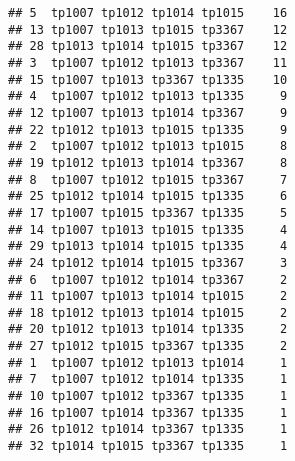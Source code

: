 \documentclass{article}\usepackage[]{graphicx}\usepackage[]{color}
\makeatletter
\newenvironment{kframe}{%
 \def\at@end@of@kframe{}%
 \ifinner\ifhmode%
  \def\at@end@of@kframe{\end{minipage}}%
  \begin{minipage}{\columnwidth}%
 \fi\fi%
 \def\FrameCommand##1{\hskip\@totalleftmargin \hskip-\fboxsep
 \colorbox{shadecolor}{##1}\hskip-\fboxsep
     \hskip-\linewidth \hskip-\@totalleftmargin \hskip\columnwidth}%
 \MakeFramed {\advance\hsize-\width
   \@totalleftmargin\z@ \linewidth\hsize
   \@setminipage}}%
 {\par\unskip\endMakeFramed%
 \at@end@of@kframe}
\newenvironment{knitrout}{}{} %
\makeatother
\begin{document}
\begin{knitrout}
\begin{kframe}
\begin{verbatim}
## 5  tp1007 tp1012 tp1014 tp1015    16
## 13 tp1007 tp1013 tp1015 tp3367    12
## 28 tp1013 tp1014 tp1015 tp3367    12
## 3  tp1007 tp1012 tp1013 tp3367    11
## 15 tp1007 tp1013 tp3367 tp1335    10
## 4  tp1007 tp1012 tp1013 tp1335     9
## 12 tp1007 tp1013 tp1014 tp3367     9
## 22 tp1012 tp1013 tp1015 tp1335     9
## 2  tp1007 tp1012 tp1013 tp1015     8
## 19 tp1012 tp1013 tp1014 tp3367     8
## 8  tp1007 tp1012 tp1015 tp3367     7
## 25 tp1012 tp1014 tp1015 tp1335     6
## 17 tp1007 tp1015 tp3367 tp1335     5
## 14 tp1007 tp1013 tp1015 tp1335     4
## 29 tp1013 tp1014 tp1015 tp1335     4
## 24 tp1012 tp1014 tp1015 tp3367     3
## 6  tp1007 tp1012 tp1014 tp3367     2
## 11 tp1007 tp1013 tp1014 tp1015     2
## 18 tp1012 tp1013 tp1014 tp1015     2
## 20 tp1012 tp1013 tp1014 tp1335     2
## 27 tp1012 tp1015 tp3367 tp1335     2
## 1  tp1007 tp1012 tp1013 tp1014     1
## 7  tp1007 tp1012 tp1014 tp1335     1
## 10 tp1007 tp1012 tp3367 tp1335     1
## 16 tp1007 tp1014 tp3367 tp1335     1
## 26 tp1012 tp1014 tp3367 tp1335     1
## 32 tp1014 tp1015 tp3367 tp1335     1
\end{verbatim}
\end{kframe}
\end{knitrout}
\end{document}
